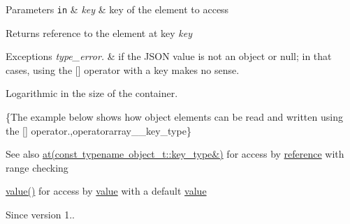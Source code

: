 \begin{DoxyParams}[1]{Parameters}
\mbox{\tt in}  & {\em key} & key of the element to access\\
\hline
\end{DoxyParams}
\begin{DoxyReturn}{Returns}
reference to the element at key {\itshape key} 
\end{DoxyReturn}

\begin{DoxyExceptions}{Exceptions}
{\em type\+\_\+error.} & if the J\+S\+ON value is not an object or null; in that cases, using the \mbox{[}\mbox{]} operator with a key makes no sense.\\
\hline
\end{DoxyExceptions}
Logarithmic in the size of the container.

\{The example below shows how object elements can be read and written using the {\ttfamily \mbox{[}\mbox{]}} operator.,operatorarray\+\_\+\+\_\+key\+\_\+type\}

\begin{DoxySeeAlso}{See also}
\mbox{\hyperlink{classnlohmann_1_1basic__json_a93403e803947b86f4da2d1fb3345cf2c}{at(const typename object\+\_\+t\+::key\+\_\+type\&)}} for access by \mbox{\hyperlink{classnlohmann_1_1basic__json_ac6a5eddd156c776ac75ff54cfe54a5bc}{reference}} with range checking 

\mbox{\hyperlink{classnlohmann_1_1basic__json_adcf8ca5079f5db993820bf50036bf45d}{value()}} for access by \mbox{\hyperlink{classnlohmann_1_1basic__json_adcf8ca5079f5db993820bf50036bf45d}{value}} with a default \mbox{\hyperlink{classnlohmann_1_1basic__json_adcf8ca5079f5db993820bf50036bf45d}{value}}
\end{DoxySeeAlso}
\begin{DoxySince}{Since}
version 1.. 
\end{DoxySince}
\mbox{\label{classnlohmann_1_1basic__json_ab2318780e5ae692039e816b6ac32c91e}} 
